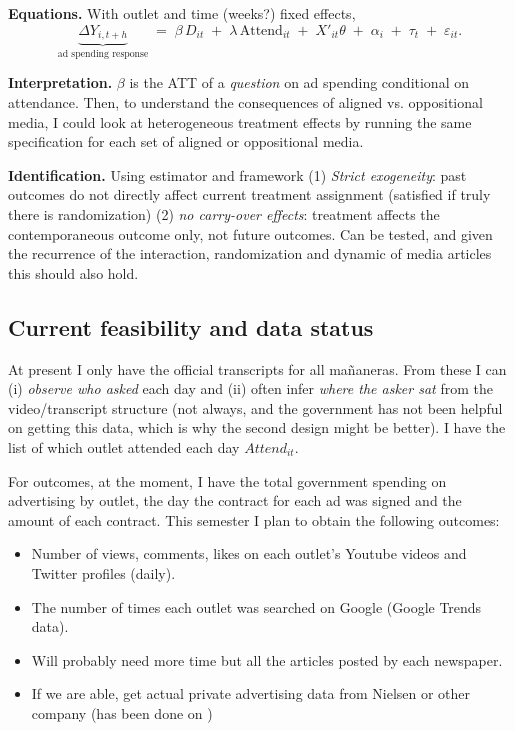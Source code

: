 \documentclass[11pt]{article}
\begin{document}
\textbf{Equations.} With outlet and time (weeks?) fixed effects,
\[
\underbrace{\Delta Y_{i,t+h}}_{\text{ad spending response}}\;=\;\beta\,D_{it}\;+\;\lambda\,\text{Attend}_{it}\;+\;X'_{it}\theta\;+\;\alpha_i\;+\;\tau_t\;+\;\varepsilon_{it}.
\]

\textbf{Interpretation.} $\beta$ is the ATT of a \emph{question} on ad spending conditional on attendance. Then, to understand the consequences of aligned vs. oppositional media, I could look at heterogeneous treatment effects by running the same specification for each set of aligned or oppositional media.

\textbf{Identification.} Using \cite{LiuEtAl} estimator and framework (1) \emph{Strict exogeneity}: past outcomes do not directly affect current treatment assignment (satisfied if truly there is randomization) (2) \emph{no carry-over effects}: treatment affects the contemporaneous outcome only, not future outcomes. Can be tested, and given the recurrence of the interaction, randomization and dynamic of media articles this should also hold. 


\subsection*{Current feasibility and data status}

At present I only have the official transcripts for all mañaneras. From these I can (i) \emph{observe who asked} each day and (ii) often infer \emph{where the asker sat} from the video/transcript structure (not always, and the government has not been helpful on getting this data, which is why the second design might be better). I have the list of which outlet attended each day $Attend_{it}$. 

For outcomes, at the moment, I have the total government spending on advertising by outlet, the day the contract for each ad was signed and the amount of each contract. This semester I plan to obtain the following outcomes: 

\begin{itemize}
    \item Number of views, comments, likes on each outlet's Youtube videos and Twitter profiles (daily).
    \item The number of times each outlet was searched on Google (Google Trends data).
    \item Will probably need more time but all the articles posted by each newspaper.
    \item If we are able, get actual private advertising data from Nielsen or other company (has been done on \citep{MediaCaptures-Zeidl-Econometrica})
\end{itemize}
\end{document}
